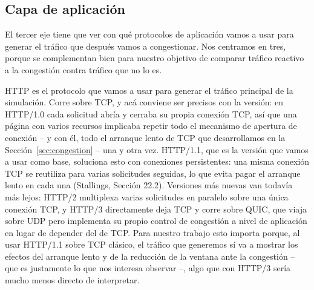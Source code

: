 \documentclass[11pt,a4paper]{article}
\begin{document}
\subsection{Capa de aplicaci\'on}
\label{sec:aplicacion}

El tercer eje tiene que ver con qu\'e protocolos de aplicaci\'on vamos a usar para generar el tr\'afico que despu\'es vamos a congestionar. Nos centramos en tres, porque se complementan bien para nuestro objetivo de comparar tr\'afico reactivo a la congesti\'on contra tr\'afico que no lo es.

HTTP es el protocolo que vamos a usar para generar el tr\'afico principal de la simulaci\'on. Corre sobre TCP, y ac\'a conviene ser precisos con la versi\'on: en HTTP/1.0 cada solicitud abr\'ia y cerraba su propia conexi\'on TCP, as\'i que una p\'agina con varios recursos implicaba repetir todo el mecanismo de apertura de conexi\'on -- y con \'el, todo el arranque lento de TCP que desarrollamos en la Secci\'on~\ref{sec:congestion} -- una y otra vez. HTTP/1.1, que es la versi\'on que vamos a usar como base, soluciona esto con conexiones persistentes: una misma conexi\'on TCP se reutiliza para varias solicitudes seguidas, lo que evita pagar el arranque lento en cada una (Stallings, Secci\'on 22.2). Versiones m\'as nuevas van todav\'ia m\'as lejos: HTTP/2 multiplexa varias solicitudes en paralelo sobre una \'unica conexi\'on TCP, y HTTP/3 directamente deja TCP y corre sobre QUIC, que viaja sobre UDP pero implementa su propio control de congesti\'on a nivel de aplicaci\'on en lugar de depender del de TCP. Para nuestro trabajo esto importa porque, al usar HTTP/1.1 sobre TCP cl\'asico, el tr\'afico que generemos s\'i va a mostrar los efectos del arranque lento y de la reducci\'on de la ventana ante la congesti\'on -- que es justamente lo que nos interesa observar --, algo que con HTTP/3 ser\'ia mucho menos directo de interpretar.
\end{document}
